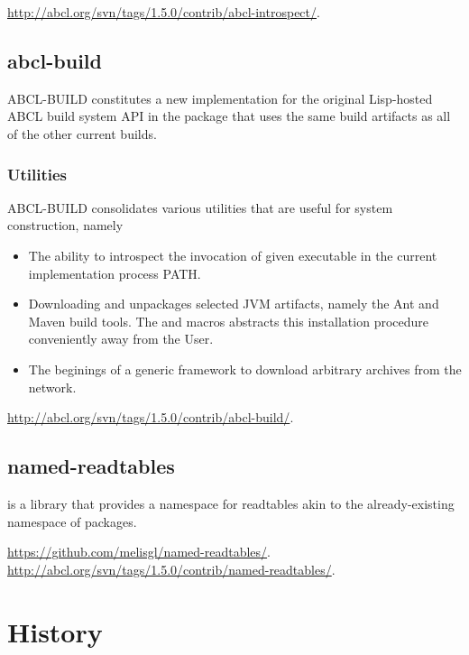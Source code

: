 \documentclass[10pt]{book}
\begin{document}
\url{http://abcl.org/svn/tags/1.5.0/contrib/abcl-introspect/}.

\section{abcl-build}

\textsc{ABCL-BUILD} constitutes a new implementation for the original
Lisp-hosted ABCL build system API in the package 
that uses the same build artifacts as all of the other current builds.

\subsection{Utilities}

\textsc{ABCL-BUILD} consolidates various utilities that are useful
for system construction, namely
\begin{itemize}

\item The ability to introspect the invocation of given executable in
  the current implementation process PATH.

\item Downloading and unpackages selected JVM artifacts, namely the
  Ant and Maven build tools.  The  and
   macros abstracts this installation
  procedure conveniently away from the User.

\item The beginings of a generic framework to download arbitrary
    archives from the network.
\end{itemize}

\url{http://abcl.org/svn/tags/1.5.0/contrib/abcl-build/}.

\section{named-readtables}

 is a library that provides a namespace for
readtables akin to the already-existing namespace of packages.

\url{https://github.com/melisgl/named-readtables/}.
\url{http://abcl.org/svn/tags/1.5.0/contrib/named-readtables/}.

\chapter{History}
\end{document}
